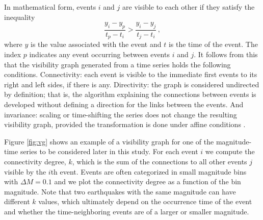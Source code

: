In mathematical form, events $i$ and $j$ are visible to each other if they satisfy the inequality
%
\begin{equation}
	\frac{y_i - y_p }{t_p - t_i} > \frac{y_i - y_j}{ t_j - t_i} \, ,
	\label{eq:vg}
\end{equation}
%
\noindent
where $y$ is the value associated with the event and $t$ is the time of the event. The index $p$ indicates any event occurring between events $i$  and $j$. It follows from this that the visibility graph generated from a time series holds the following conditions. Connectivity: each event is visible to the immediate first events to its right and left sides, if there is any. Directivity: the graph is considered undirected by definition; that is, the algorithm explaining the connections between events is developed without defining a direction for the links between the events. And invariance: scaling or time-shifting the series does not change the resulting visibility graph, provided the transformation is done under affine conditions \citep{Lacasa2008}.

Figure \ref{fig:vg} shows an example of a visibility graph for one of the magnitude-time series to be considered later in this study. For each event $i$ we compute the connectivity degree, $k$, which is the sum of the connections to all other events $j$ visible by the $i$th event. Events are often categorized in small magnitude bins with $\Delta M = 0.1$ and we plot the connectivity degree as a function of the bin magnitude. Note that two earthquakes with the same magnitude can have different $k$ values, which ultimately depend on the occurrence time of the event and whether the time-neighboring events are of a larger or smaller magnitude.

